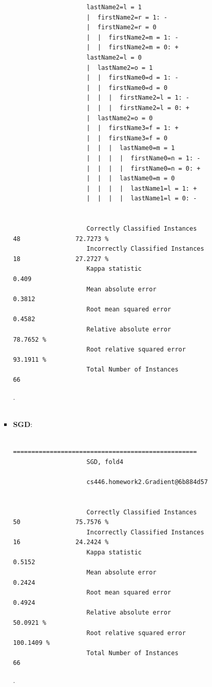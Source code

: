 \begin{enumerate}
\begin{itemize}
\begin{itemize}
\begin{verbatim}
					lastName2=l = 1
					|  firstName2=r = 1: -
					|  firstName2=r = 0
					|  |  firstName2=m = 1: -
					|  |  firstName2=m = 0: +
					lastName2=l = 0
					|  lastName2=o = 1
					|  |  firstName0=d = 1: -
					|  |  firstName0=d = 0
					|  |  |  firstName2=l = 1: -
					|  |  |  firstName2=l = 0: +
					|  lastName2=o = 0
					|  |  firstName3=f = 1: +
					|  |  firstName3=f = 0
					|  |  |  lastName0=m = 1
					|  |  |  |  firstName0=n = 1: -
					|  |  |  |  firstName0=n = 0: +
					|  |  |  lastName0=m = 0
					|  |  |  |  lastName1=l = 1: +
					|  |  |  |  lastName1=l = 0: -


					Correctly Classified Instances          48               72.7273 %
					Incorrectly Classified Instances        18               27.2727 %
					Kappa statistic                          0.409
					Mean absolute error                      0.3812
					Root mean squared error                  0.4582
					Relative absolute error                 78.7652 %
					Root relative squared error             93.1911 %
					Total Number of Instances               66
					\end{verbatim}
					.\\\\
				\item \textbf{SGD}: \\
					\begin{verbatim}
					==================================================
					SGD, fold4

					cs446.homework2.Gradient@6b884d57


					Correctly Classified Instances          50               75.7576 %
					Incorrectly Classified Instances        16               24.2424 %
					Kappa statistic                          0.5152
					Mean absolute error                      0.2424
					Root mean squared error                  0.4924
					Relative absolute error                 50.0921 %
					Root relative squared error            100.1409 %
					Total Number of Instances               66
					\end{verbatim}
					.\\\\
			\end{itemize}
		\end{itemize}
\end{enumerate}




